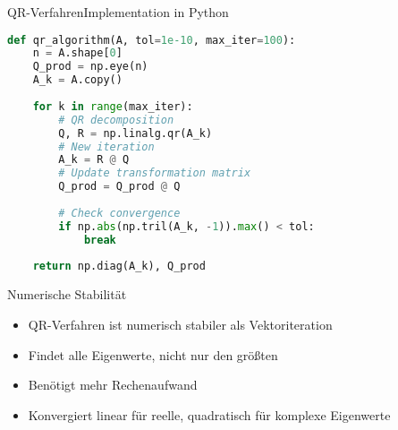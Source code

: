 \begin{example2}{QR-Verfahren}{Implementation in Python}
\begin{lstlisting}[language=Python, style=basesmol]
def qr_algorithm(A, tol=1e-10, max_iter=100):
    n = A.shape[0]
    Q_prod = np.eye(n)
    A_k = A.copy()
    
    for k in range(max_iter):
        # QR decomposition
        Q, R = np.linalg.qr(A_k)
        # New iteration
        A_k = R @ Q
        # Update transformation matrix
        Q_prod = Q_prod @ Q
        
        # Check convergence
        if np.abs(np.tril(A_k, -1)).max() < tol:
            break
            
    return np.diag(A_k), Q_prod
\end{lstlisting}
\end{example2}

\begin{remark2}{Numerische Stabilität}
\begin{itemize}
    \item QR-Verfahren ist numerisch stabiler als Vektoriteration
    \item Findet alle Eigenwerte, nicht nur den größten
    \item Benötigt mehr Rechenaufwand
    \item Konvergiert linear für reelle, quadratisch für komplexe Eigenwerte
\end{itemize}
\end{remark2}